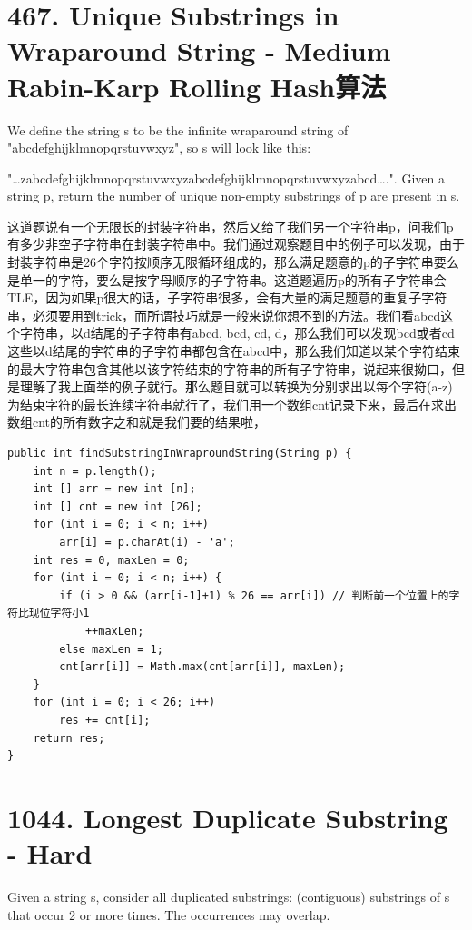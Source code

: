 \documentclass[9pt, b5paaper]{book}
\begin{document}
\section{467. Unique Substrings in Wraparound String - Medium Rabin-Karp Rolling Hash算法}
\label{sec-6-3}
We define the string s to be the infinite wraparound string of "abcdefghijklmnopqrstuvwxyz", so s will look like this:

"\ldots{}zabcdefghijklmnopqrstuvwxyzabcdefghijklmnopqrstuvwxyzabcd\ldots{}.".
Given a string p, return the number of unique non-empty substrings of p are present in s.

这道题说有一个无限长的封装字符串，然后又给了我们另一个字符串p，问我们p有多少非空子字符串在封装字符串中。我们通过观察题目中的例子可以发现，由于封装字符串是26个字符按顺序无限循环组成的，那么满足题意的p的子字符串要么是单一的字符，要么是按字母顺序的子字符串。这道题遍历p的所有子字符串会TLE，因为如果p很大的话，子字符串很多，会有大量的满足题意的重复子字符串，必须要用到trick，而所谓技巧就是一般来说你想不到的方法。我们看abcd这个字符串，以d结尾的子字符串有abcd, bcd, cd, d，那么我们可以发现bcd或者cd这些以d结尾的字符串的子字符串都包含在abcd中，那么我们知道以某个字符结束的最大字符串包含其他以该字符结束的字符串的所有子字符串，说起来很拗口，但是理解了我上面举的例子就行。那么题目就可以转换为分别求出以每个字符(a-z)为结束字符的最长连续字符串就行了，我们用一个数组cnt记录下来，最后在求出数组cnt的所有数字之和就是我们要的结果啦，

\begin{verbatim}
public int findSubstringInWraproundString(String p) {
    int n = p.length();
    int [] arr = new int [n];
    int [] cnt = new int [26];
    for (int i = 0; i < n; i++) 
        arr[i] = p.charAt(i) - 'a';
    int res = 0, maxLen = 0;
    for (int i = 0; i < n; i++) {
        if (i > 0 && (arr[i-1]+1) % 26 == arr[i]) // 判断前一个位置上的字符比现位字符小1
            ++maxLen;
        else maxLen = 1;
        cnt[arr[i]] = Math.max(cnt[arr[i]], maxLen);
    }
    for (int i = 0; i < 26; i++) 
        res += cnt[i];
    return res;
}
\end{verbatim}

\section{1044. Longest Duplicate Substring - Hard}
\label{sec-6-4}
Given a string s, consider all duplicated substrings: (contiguous) substrings of s that occur 2 or more times. The occurrences may overlap.
\end{document}
